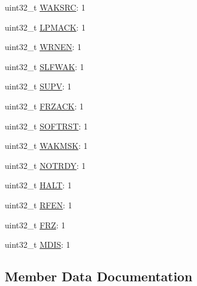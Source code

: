 \begin{DoxyCompactItemize}
uint32\+\_\+t \hyperlink{struct__hw__can__mcr_1_1__hw__can__mcr__bitfields_a4e1607c011c2017a9eda845e6ae6dcfb}{W\+A\+K\+S\+RC}\+: 1
\item 
uint32\+\_\+t \hyperlink{struct__hw__can__mcr_1_1__hw__can__mcr__bitfields_a932857adf4ddf2a429927f7e30a406b5}{L\+P\+M\+A\+CK}\+: 1
\item 
uint32\+\_\+t \hyperlink{struct__hw__can__mcr_1_1__hw__can__mcr__bitfields_af4c1e7146ee0d2b265ab8390d4e433b9}{W\+R\+N\+EN}\+: 1
\item 
uint32\+\_\+t \hyperlink{struct__hw__can__mcr_1_1__hw__can__mcr__bitfields_a034123be96b4bf43fad443002af8b4de}{S\+L\+F\+W\+AK}\+: 1
\item 
uint32\+\_\+t \hyperlink{struct__hw__can__mcr_1_1__hw__can__mcr__bitfields_ae06325995fcab34d1e38ecf2b17f15c7}{S\+U\+PV}\+: 1
\item 
uint32\+\_\+t \hyperlink{struct__hw__can__mcr_1_1__hw__can__mcr__bitfields_ac9ea47f5f3e1412d75d8b483028ae818}{F\+R\+Z\+A\+CK}\+: 1
\item 
uint32\+\_\+t \hyperlink{struct__hw__can__mcr_1_1__hw__can__mcr__bitfields_ab25156e38f1ee53829cd9138f291b69a}{S\+O\+F\+T\+R\+ST}\+: 1
\item 
uint32\+\_\+t \hyperlink{struct__hw__can__mcr_1_1__hw__can__mcr__bitfields_a4e49d98e464a2c07436c9a7970608b67}{W\+A\+K\+M\+SK}\+: 1
\item 
uint32\+\_\+t \hyperlink{struct__hw__can__mcr_1_1__hw__can__mcr__bitfields_af4f9bd06dea3c1df2fc782d26b914aff}{N\+O\+T\+R\+DY}\+: 1
\item 
uint32\+\_\+t \hyperlink{struct__hw__can__mcr_1_1__hw__can__mcr__bitfields_a926250cee96fd61a576af39ec6a2256b}{H\+A\+LT}\+: 1
\item 
uint32\+\_\+t \hyperlink{struct__hw__can__mcr_1_1__hw__can__mcr__bitfields_a26cd6004a2193827fec5e8905403f36d}{R\+F\+EN}\+: 1
\item 
uint32\+\_\+t \hyperlink{struct__hw__can__mcr_1_1__hw__can__mcr__bitfields_addca5117ba4faa63e5cb9e78c0d627d1}{F\+RZ}\+: 1
\item 
uint32\+\_\+t \hyperlink{struct__hw__can__mcr_1_1__hw__can__mcr__bitfields_a58c6ebe946c66b23f007c42c1cc3b3d8}{M\+D\+IS}\+: 1
\end{DoxyCompactItemize}


\subsection{Member Data Documentation}
